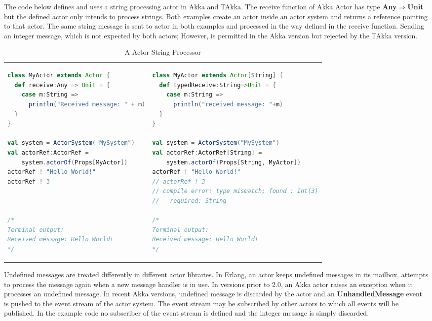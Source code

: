 The code below defines and uses a string processing actor in Akka and TAkka.  The receive
function of Akka Actor has type {\bf Any$\Rightarrow$Unit} but the defined actor
only intends to process strings. Both examples create an actor inside an actor system
and returns a reference pointing to that actor.  The same string message is sent to actor in both examples
and processed in the way defined in the receive function.  Sending an integer message, which is not expected
by both actors; However, is permitted in the Akka version but rejected by the TAkka version.

\begin{table}[h]
\label{ActorRef}
     \begin{adjustwidth}{-0.8cm}{}
  \begin{tabular}{ l   l }
      \begin{lstlisting}[language=scala]
class MyActor extends Actor {
  def receive:Any => Unit = {
    case m:String =>
      println("Received message: " + m)
  }
}

val system = ActorSystem("MySystem")
val actorRef:ActorRef =
    system.actorOf(Props[MyActor])
actorRef ! "Hello World!"
actorRef ! 3



/*
Terminal output:
Received message: Hello World!
*/
    \end{lstlisting}
&
      \begin{lstlisting}[language=scala]
class MyActor extends Actor[String] {
  def typedReceive:String=>Unit = {
    case m:String =>
      println("received message: "+m)
  }
}

val system = ActorSystem("MySystem")
val actorRef:ActorRef[String] = 
    system.actorOf(Props[String, MyActor])
actorRef ! "Hello World!"
// actorRef ! 3 
// compile error: type mismatch; found : Int(3)
//   required: String

/*
Terminal output:
Received message: Hello World!
*/
    \end{lstlisting}

  \end{tabular}
  \end{adjustwidth}
    \caption{A Actor String Processor}
\end{table}

Undefined messages are treated differently in different actor libraries.  In
Erlang, an actor keeps undefined messages in its mailbox, attempts to process
the message again when a new message handler is in use.  In versions prior to
2.0, an Akka actor raises an exception when it processes an undefined message.
In recent Akka versions, undefined message is discarded by the actor and an {\bf
UnhandledMessage} event is pushed to the event stream of the actor system. The
event stream may be subscribed by other actors to which all events will be
published.  In the example code no subscriber of the event stream is defined and
the integer message is simply discarded.


